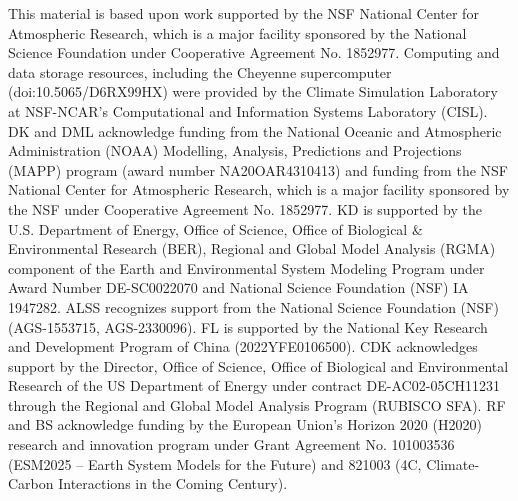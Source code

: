 \documentclass[draft]{agujournal2019}
\begin{document}
\acknowledgments
This material is based upon work supported by the NSF National Center for Atmospheric Research, which is a major facility sponsored by the National Science Foundation under Cooperative Agreement No. 1852977. Computing and data storage resources, including the Cheyenne supercomputer (doi:10.5065/D6RX99HX) were provided by the Climate Simulation Laboratory at NSF-NCAR’s Computational and Information Systems Laboratory (CISL). DK and DML acknowledge funding from the National Oceanic and Atmospheric Administration (NOAA) Modelling, Analysis, Predictions and Projections (MAPP) program (award number NA20OAR4310413) and funding from the NSF National Center for Atmospheric Research, which is a major facility sponsored by the NSF under Cooperative Agreement No. 1852977. KD is supported by the U.S. Department of Energy, Office of Science, Office of Biological \& Environmental Research (BER), Regional and Global Model Analysis (RGMA) component of the Earth and Environmental System Modeling Program under Award Number DE-SC0022070 and National Science Foundation (NSF) IA 1947282. ALSS recognizes support from the National Science Foundation (NSF) (AGS-1553715, AGS-2330096). FL is supported by the National Key Research and Development Program of China (2022YFE0106500). CDK acknowledges support by the Director, Office of Science, Office of Biological and Environmental Research of the US Department of Energy under contract DE-AC02-05CH11231 through the Regional and Global Model Analysis Program (RUBISCO SFA). RF and BS acknowledge funding by the European Union’s Horizon 2020 (H2020) research and innovation program under Grant Agreement No. 101003536 (ESM2025 – Earth System Models for the Future) and 821003 (4C, Climate-Carbon Interactions in the Coming Century).




\end{document}
